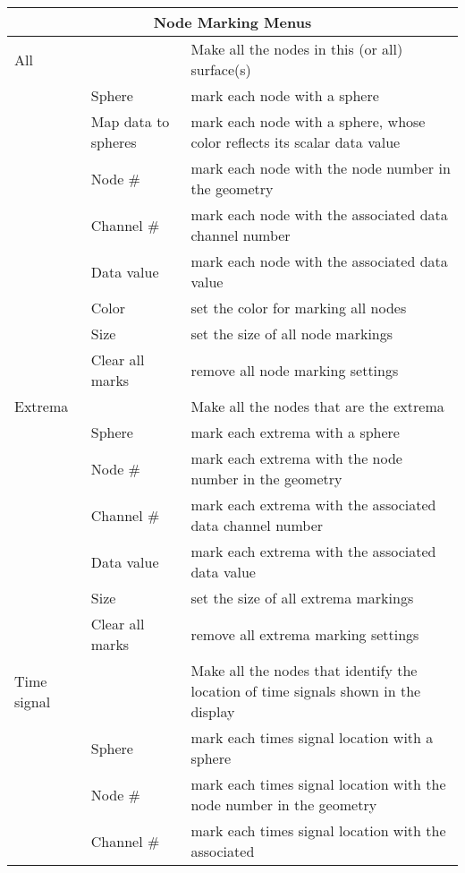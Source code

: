 \begin{table}[ht]
  \begin{center}
    \begin{tabular}{|l|l|p{4 in}|} \hline
      \multicolumn{3}{|c|}{\textbf{Node Marking Menus}} \\ \hline
    All & & Make all the nodes in this (or all) surface(s) \\
    &  Sphere & mark each node with a sphere \\
    &  Map data to spheres & mark each node with a sphere, whose
                             color reflects its scalar data value \\
    &  Node \# & mark each node with the node number in the geometry \\
    &  Channel \# & mark each node with the associated data channel number \\
    &  Data value & mark each node with the associated data value \\
    &  Color & set the color for marking all nodes \\
    &  Size & set the size of all node markings \\
    &  Clear all marks & remove all node marking settings \\ 
    \hline
    Extrema & & Make all the nodes that are the extrema  \\
    &  Sphere & mark each extrema with a sphere \\
    &  Node \# & mark each extrema with the node number in the geometry \\
    &  Channel \# & mark each extrema with the associated data channel
    number \\ 
    &  Data value & mark each extrema with the associated data value \\
    &  Size & set the size of all extrema markings \\
    &  Clear all marks & remove all extrema marking settings \\ 
    \hline
    Time signal & & Make all the nodes that identify the location of time
    signals shown in the display  \\
    &  Sphere & mark each times signal location with a sphere \\
    &  Node \# & mark each times signal location with the node number in
    the geometry \\ 
    &  Channel \# & mark each times signal location with the associated

\end{tabular}
\end{center}
\end{table}
